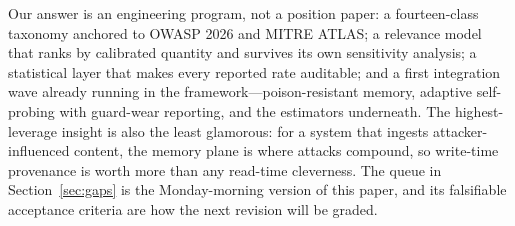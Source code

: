 Our answer is an engineering program, not a position paper: a fourteen-class
taxonomy anchored to OWASP 2026 and MITRE ATLAS; a relevance model that ranks
by calibrated quantity and survives its own sensitivity analysis; a statistical
layer that makes every reported rate auditable; and a first integration wave
already running in the framework---poison-resistant memory, adaptive
self-probing with guard-wear reporting, and the estimators underneath. The
highest-leverage insight is also the least glamorous: for a system that
ingests attacker-influenced content, the memory plane is where attacks
compound, so write-time provenance is worth more than any read-time cleverness.
The queue in Section~\ref{sec:gaps} is the Monday-morning version of this
paper, and its falsifiable acceptance criteria are how the next revision will
be graded.
